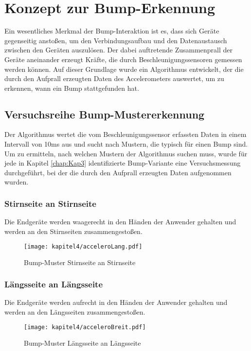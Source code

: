 \newpage
\section{Konzept zur Bump-Erkennung}
\label{sec:BumpErkennung}

Ein wesentliches Merkmal der Bump-Interaktion ist es, dass sich Geräte gegenseitig anstoßen, um den Verbindungsaufbau und den Datenaustausch zwischen den Geräten auszulösen. Der dabei auftretende Zusammenprall der Geräte aneinander erzeugt Kräfte, die durch Beschleunigungssensoren gemessen werden können. Auf dieser Grundlage wurde ein Algorithmus entwickelt, der die durch den Aufprall erzeugten Daten des Accelerometers auswertet, um zu erkennen, wann ein Bump stattgefunden hat. 

\subsection{Versuchsreihe Bump-Mustererkennung}
Der Algorithmus wertet die vom Beschleunigungssensor erfassten Daten in einem Intervall von 10ms aus und sucht nach Mustern, die typisch für einen Bump sind. Um zu ermitteln, nach welchen Mustern der Algorithmus suchen muss, wurde für jede in Kapitel \ref{chap:Kap3} identifizierte Bump-Variante eine Versuchsmessung durchgeführt, bei der die durch den Aufprall erzeugten Daten aufgenommen wurden.

\subsubsection{Stirnseite an Stirnseite}
Die Endgeräte werden waagerecht in den Händen der Anwender gehalten und werden an den Stirnseiten zusammengestoßen.
\begin{figure}[H]
    \centering
    \texttt{[image: kapitel4/acceleroLang.pdf]}
    \caption{Bump-Muster Stirnseite an Stirnseite}
    \label{fig:stirnanstirn}
\end{figure}

\subsubsection{Längsseite an Längsseite}
Die Endgeräte werden aufrecht in den Händen der Anwender gehalten und werden an den Längsseiten zusammengestoßen.
\begin{figure}[H]
    \centering
    \texttt{[image: kapitel4/acceleroBreit.pdf]}
    \caption{Bump-Muster Längsseite an Längsseite}
    \label{fig:längsanlängs}
\end{figure}

